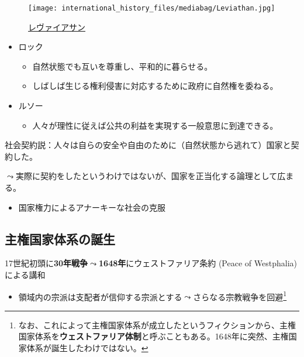 \documentclass[
  xelatex,
  ja=standard]{bxjsarticle}
\providecommand{\tightlist}{%
  \setlength{\itemsep}{0pt}\setlength{\parskip}{0pt}}\usepackage{longtable,booktabs,array}
\begin{document}
\begin{figure}[htpb]

{\centering \texttt{[image: international\_history\_files/mediabag/Leviathan.jpg]}

}

\caption{\href{https://commons.wikimedia.org/wiki/File:Leviathan.jpg?uselang=ja}{レヴァイアサン}}

\end{figure}

\begin{itemize}
\tightlist
\item
  ロック

  \begin{itemize}
  \tightlist
  \item
    自然状態でも互いを尊重し、平和的に暮らせる。
  \item
    しばしば生じる権利侵害に対応するために政府に自然権を委ねる。
  \end{itemize}
\item
  ルソー

  \begin{itemize}
  \tightlist
  \item
    人々が理性に従えば公共の利益を実現する一般意思に到達できる。
  \end{itemize}
\end{itemize}

社会契約説：人々は自らの安全や自由のために（自然状態から逃れて）国家と契約した。

\(\leadsto\)実際に契約をしたというわけではないが、国家を正当化する論理として広まる。

\begin{itemize}
\tightlist
\item
  国家権力によるアナーキーな社会の克服
\end{itemize}

\hypertarget{ux4e3bux6a29ux56fdux5bb6ux4f53ux7cfbux306eux8a95ux751f}{%
\subsection{主権国家体系の誕生}\label{ux4e3bux6a29ux56fdux5bb6ux4f53ux7cfbux306eux8a95ux751f}}

17世紀初頭に\textbf{30年戦争}\(\leadsto\)\textbf{1648年}にウェストファリア条約
(Peace of Westphalia) による講和

\begin{itemize}
\tightlist
\item
  領域内の宗派は支配者が信仰する宗派とする\(\leadsto\)さらなる宗教戦争を回避\footnote{なお、これによって主権国家体系が成立したというフィクションから、主権国家体系を\textbf{ウェストファリア体制}と呼ぶこともある。1648年に突然、主権国家体系が誕生したわけではない\citep[p.16]{ogawa2018}。}
\end{itemize}
\end{document}
